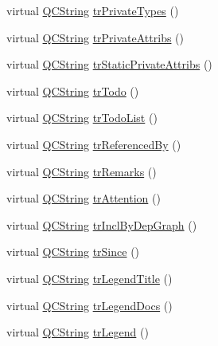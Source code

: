 \begin{DoxyCompactItemize}
\item 
virtual \hyperlink{class_q_c_string}{Q\+C\+String} \hyperlink{class_translator_serbian_cyrillic_a78813cc3fbc32c707117e55d55c73849}{tr\+Private\+Types} ()
\item 
virtual \hyperlink{class_q_c_string}{Q\+C\+String} \hyperlink{class_translator_serbian_cyrillic_ac6e35b8cd00752b0f7c52561c1cb6f94}{tr\+Private\+Attribs} ()
\item 
virtual \hyperlink{class_q_c_string}{Q\+C\+String} \hyperlink{class_translator_serbian_cyrillic_a8ca431354b09ed91d0ccbca254d9ad1a}{tr\+Static\+Private\+Attribs} ()
\item 
virtual \hyperlink{class_q_c_string}{Q\+C\+String} \hyperlink{class_translator_serbian_cyrillic_ae2667ef1006188c09f176692db4d9cef}{tr\+Todo} ()
\item 
virtual \hyperlink{class_q_c_string}{Q\+C\+String} \hyperlink{class_translator_serbian_cyrillic_aa7cef410dd0fc65132f72eea861b4a71}{tr\+Todo\+List} ()
\item 
virtual \hyperlink{class_q_c_string}{Q\+C\+String} \hyperlink{class_translator_serbian_cyrillic_a1185121eae0df502e8c5ccbd3a403c1d}{tr\+Referenced\+By} ()
\item 
virtual \hyperlink{class_q_c_string}{Q\+C\+String} \hyperlink{class_translator_serbian_cyrillic_a01d4b3b8c0ab94fd39745dff314a4616}{tr\+Remarks} ()
\item 
virtual \hyperlink{class_q_c_string}{Q\+C\+String} \hyperlink{class_translator_serbian_cyrillic_aa69e5c21cf1454163978b88586dd4e95}{tr\+Attention} ()
\item 
virtual \hyperlink{class_q_c_string}{Q\+C\+String} \hyperlink{class_translator_serbian_cyrillic_afa0b5d02d75de53ed3b08132f302e983}{tr\+Incl\+By\+Dep\+Graph} ()
\item 
virtual \hyperlink{class_q_c_string}{Q\+C\+String} \hyperlink{class_translator_serbian_cyrillic_a40c0bb65686ce28684d761d0e39b80a7}{tr\+Since} ()
\item 
virtual \hyperlink{class_q_c_string}{Q\+C\+String} \hyperlink{class_translator_serbian_cyrillic_a862a73dd2e1fb19e00cd8f13ef20dfa2}{tr\+Legend\+Title} ()
\item 
virtual \hyperlink{class_q_c_string}{Q\+C\+String} \hyperlink{class_translator_serbian_cyrillic_ab7f39c42a0e790816df7723eef4fcc21}{tr\+Legend\+Docs} ()
\item 
virtual \hyperlink{class_q_c_string}{Q\+C\+String} \hyperlink{class_translator_serbian_cyrillic_a75d750ec709bd32814486d1a62e7d2bc}{tr\+Legend} ()
\item 

\end{DoxyCompactItemize}
